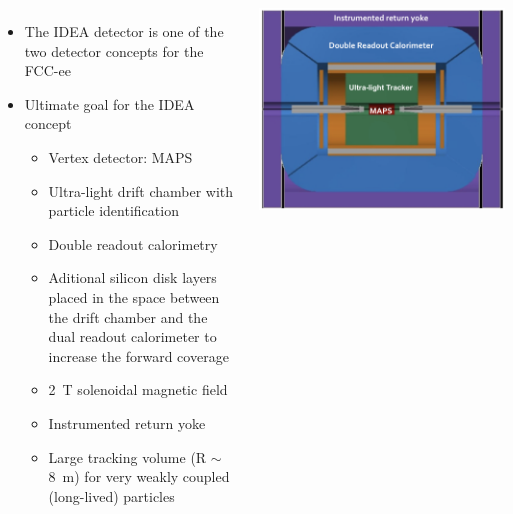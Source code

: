 \documentclass[final,xcolor={dvipsnames,svgnames,x11names,table}]{beamer}
\begin{document}
\begin{frame}
\begin{textblock}{83}
\begin{tcolorbox}[title=The IDEA detector concept for FCC-ee]
  \begin{columns}
      \begin{itemize}
        \item The IDEA detector is one of the two detector concepts for the FCC-ee \vspace{0.5cm}
        \item Ultimate goal for the IDEA concept \vspace{0.5cm}
          \begin{itemize}
            \item Vertex detector: MAPS \vspace{0.2cm}
            \item Ultra-light drift chamber with particle identification \vspace{0.2cm}
            \item Double readout calorimetry \vspace{0.2cm}
            \item Aditional silicon disk layers placed in the space between the drift chamber and the dual readout calorimeter to increase the forward coverage \vspace{0.2cm}
            \item 2~T solenoidal magnetic field \vspace{0.2cm}
            \item Instrumented return yoke \vspace{0.2cm}
            \item Large tracking volume (R $\sim$ 8~m) for very weakly coupled (long-lived) particles
          \end{itemize}
      \end{itemize}


      \centering
      \includegraphics[width=\textwidth]{../figures/FCCeeIDEAConcept}


\end{columns}
\end{tcolorbox}
\end{textblock}
\end{frame}
\end{document}
